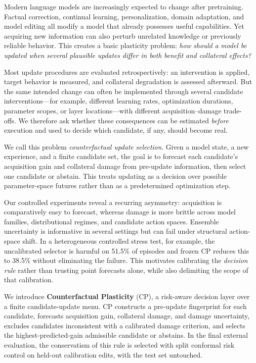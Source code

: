 \documentclass{article} %
\begin{document}
Modern language models are increasingly expected to change after pretraining.
Factual correction, continual learning, personalization, domain adaptation,
and model editing all modify a model that already possesses useful
capabilities. Yet acquiring new information can also perturb unrelated
knowledge or previously reliable behavior. This creates a basic plasticity
problem: \emph{how should a model be updated when several plausible updates
differ in both benefit and collateral effects?}

Most update procedures are evaluated retrospectively: an intervention is
applied, target behavior is measured, and collateral degradation is assessed
afterward. But the same intended change can often be implemented through
several candidate interventions---for example, different learning rates,
optimization durations, parameter scopes, or layer locations---with different
acquisition--damage trade-offs. We therefore ask whether these consequences
can be estimated \emph{before} execution and used to decide which candidate,
if any, should become real.

We call this problem \emph{counterfactual update selection}. Given a model
state, a new experience, and a finite candidate set, the goal is to forecast
each candidate's acquisition gain and collateral damage from pre-update
information, then select one candidate or abstain. This treats updating as a
decision over possible parameter-space futures rather than as a predetermined
optimization step.

Our controlled experiments reveal a recurring asymmetry: acquisition is
comparatively easy to forecast, whereas damage is more brittle across model
families, distributional regimes, and candidate action spaces. Ensemble
uncertainty is informative in several settings but can fail under structural
action-space shift. In a heterogeneous controlled stress test, for example,
the uncalibrated selector is harmful on 51.5\% of episodes and frozen CP
reduces this to 38.5\% without eliminating the failure. This motivates
calibrating the \emph{decision rule} rather than trusting point forecasts
alone, while also delimiting the scope of that calibration.

We introduce \textbf{Counterfactual Plasticity} (CP), a risk-aware decision
layer over a finite candidate-update menu. CP constructs a pre-update
fingerprint for each candidate, forecasts acquisition gain, collateral damage,
and damage uncertainty, excludes candidates inconsistent with a calibrated
damage criterion, and selects the highest-predicted-gain admissible candidate
or abstains. In the final external evaluation, the conservatism of this rule
is selected with split conformal risk control on held-out calibration edits,
with the test set untouched.
\end{document}

